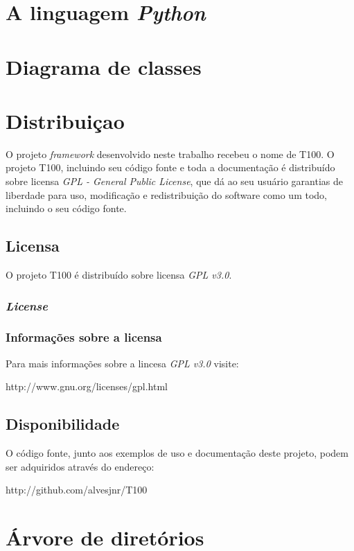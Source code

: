 \chapter{A linguagem \textit{Python} \label{appendix_python}}
\chapter{Diagrama de classes \label{appendix_uml_completo}}
\chapter{Distribuiçao}

O projeto \textit{framework} desenvolvido neste trabalho recebeu o nome de T100. O projeto T100, incluindo seu código fonte e toda a documentação é distribuído sobre licensa \textit{GPL - General Public License}, que dá ao seu usuário garantias de liberdade para uso, modificação e redistribuição do software como um todo, incluindo o seu código fonte.

\section{Licensa}

O projeto T100 é distribuído sobre licensa \textit{GPL v3.0}.

\subsection{\emph{License}}



\subsection{Informações sobre a licensa}

Para mais informações sobre a lincesa \textit{GPL v3.0} visite:

http://www.gnu.org/licenses/gpl.html

\section{Disponibilidade}

O código fonte, junto aos exemplos de uso e documentação deste projeto, podem ser adquiridos através do endereço:

http://github.com/alvesjnr/T100


\chapter{Árvore de diretórios \label{appendix_tree}}

